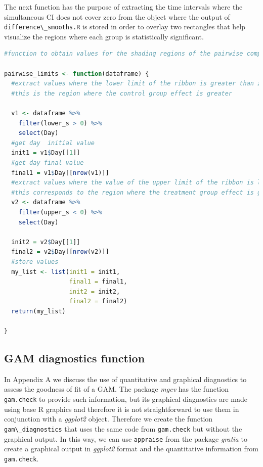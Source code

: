 \documentclass[
]{article}
\newcommand{\passthrough}[1]{#1}
\begin{document}
The next function has the purpose of extracting the time intervals where the simultaneous CI does not cover zero from the object where the output of \passthrough{\lstinline!difference\_smooths.R!} is stored in order to overlay two rectangles that help visualize the regions where each group is statistically significant.

\begin{lstlisting}[language=R]
#function to obtain values for the shading regions of the pairwise comparison between the smooths

pairwise_limits <- function(dataframe) {
  #extract values where the lower limit of the ribbon is greater than zero
  #this is the region where the control group effect is greater
  
  v1 <- dataframe %>%
    filter(lower_s > 0) %>%
    select(Day)
  #get day  initial value
  init1 = v1$Day[[1]]
  #get day final value
  final1 = v1$Day[[nrow(v1)]]
  #extract values where the value of the upper limit of the ribbon is lower than zero
  #this corresponds to the region where the treatment group effect is greater
  v2 <- dataframe %>%
    filter(upper_s < 0) %>%
    select(Day)
  
  init2 = v2$Day[[1]]
  final2 = v2$Day[[nrow(v2)]]
  #store values
  my_list <- list(init1 = init1,
                  final1 = final1,
                  init2 = init2,
                  final2 = final2)
  return(my_list)
  
}
\end{lstlisting}

\hypertarget{gam-diagnostics-function}{%
\subsection{GAM diagnostics function}\label{gam-diagnostics-function}}

In Appendix A we discuss the use of quantitative and graphical diagnostics to assess the goodness of fit of a GAM. The package \emph{mgcv} has the function \passthrough{\lstinline!gam.check!} to provide such information, but its graphical diagnostics are made using base R graphics and therefore it is not straightforward to use them in conjunction with a \emph{ggplot2} object. Therefore we create the function \passthrough{\lstinline!gam\_diagnostics!} that uses the same code from \passthrough{\lstinline!gam.check!} but without the graphical output. In this way, we can use \passthrough{\lstinline!appraise!} from the package \emph{gratia} to create a graphical output in \emph{ggplot2} format and the quantitative information from \passthrough{\lstinline!gam.check!}.
\end{document}
